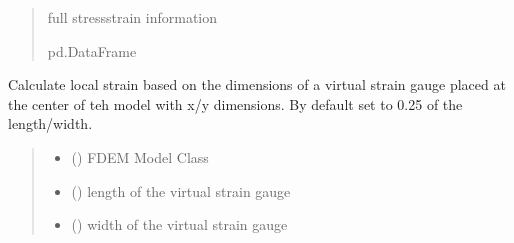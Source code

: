 \documentclass[letterpaper,10pt,english]{sphinxmanual}
\begin{document}
\begin{fulllineitems}
\begin{quote}
\begin{description}
\begin{itemize}
\end{itemize}

\sphinxAtStartPar
full stress\sphinxhyphen{}strain information

\sphinxAtStartPar
pd.DataFrame

\end{description}\end{quote}

\end{fulllineitems}


\begin{fulllineitems}
\label{\detokenize{pyfdempp:pyfdempp.complete_BD_thread_pool_generators.set_strain_gauge}}
\pysigstartsignatures
{}
\pysigstopsignatures
\sphinxAtStartPar
Calculate local strain based on the dimensions of a virtual strain gauge placed at the center of teh model with
x/y dimensions. By default set to 0.25 of the length/width.
\begin{quote}\begin{description}
\begin{itemize}
\item {} 
\sphinxAtStartPar
{} () \textendash{} FDEM Model Class

\item {} 
\sphinxAtStartPar
{} () \textendash{} length of the virtual strain gauge

\item {} 
\sphinxAtStartPar
{} () \textendash{} width of the virtual strain gauge


\end{itemize}
\end{description}
\end{quote}
\end{fulllineitems}
\end{document}
